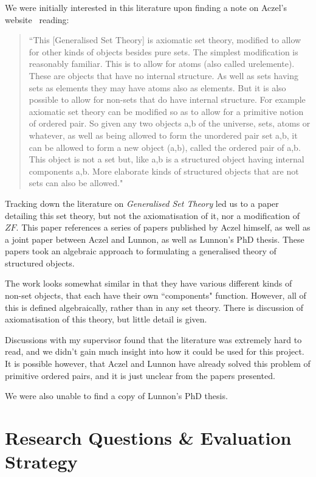 \documentclass[11pt]{report}
\theoremstyle{definition}
\theoremstyle{theorem}
\theoremstyle{lemma}
\begin{document}
We were initially interested in this literature upon finding a note on Aczel's website~\cite{aczelsite} reading: 
\begin{quotation}
\begin{small}
\noindent
``This [Generalised Set Theory] is axiomatic set theory, modified to allow for other kinds of objects besides pure sets. The simplest modification is reasonably familiar. This is to allow for atoms (also called urelemente). These are objects that have no internal structure. As well as sets having sets as elements they may have atoms also as elements. But it is also possible to allow for non-sets that do have internal structure. For example axiomatic set theory can be modified so as to allow for a primitive notion of ordered pair. So given any two objects a,b of the universe, sets, atoms or whatever, as well as being allowed to form the unordered pair set {a,b}, it can be allowed to form a new object (a,b), called the ordered pair of a,b. This object is not a set but, like {a,b} is a structured object having internal components a,b. More elaborate kinds of structured objects that are not sets can also be allowed."
\end{small}
\end{quotation}
Tracking down the literature on \emph{Generalised Set Theory} led us to a paper~\cite{gst} detailing this set theory, but not the axiomatisation of it, nor a modification of $ZF$. 
This paper references a series of papers published by Aczel himself, as well as a joint paper between Aczel and Lunnon, as well as Lunnon's PhD thesis.
These papers took an algebraic approach to formulating a generalised theory of structured objects.

The work looks somewhat similar in that they have various different kinds of non-set objects, that each have their own ``components" function. 
However, all of this is defined algebraically, rather than in any set theory. 
There is discussion of axiomatisation of this theory, but little detail is given. 

Discussions with my supervisor found that the literature was extremely hard to read, and we didn't gain much insight into how it could be used for this project.
It is possible however, that Aczel and Lunnon have already solved this problem of primitive ordered pairs, and it is just unclear from the papers presented. 

We were also unable to find a copy of Lunnon's PhD thesis.
\chapter{Research Questions \& Evaluation Strategy}
\end{document}
